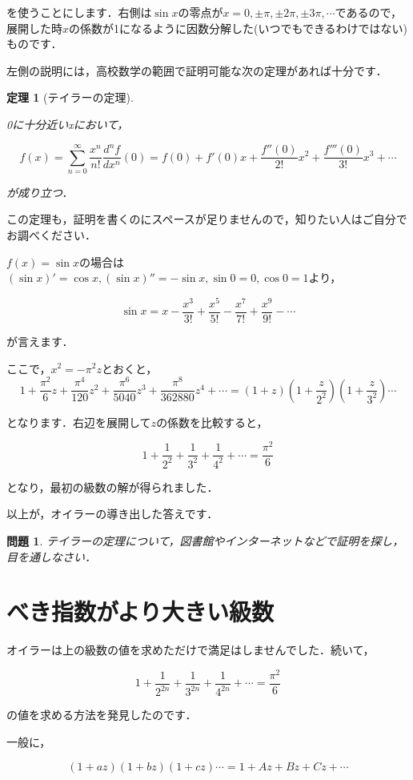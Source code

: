 \documentclass[./main]{subfiles}
\theoremstyle{break}
\newtheorem*{thm}{定理}
\newtheorem*{prb}{問題}
\begin{document}
を使うことにします．右側は$\sin x$の零点が$x=0,\pm \pi,\pm 2\pi,\pm 3\pi,\cdots$であるので，展開した時$x$の係数が1になるように因数分解した(いつでもできるわけではない)ものです．

左側の説明には，高校数学の範囲で証明可能な次の定理があれば十分です．

\begin{thm}[テイラーの定理]
　

0に十分近いxにおいて，

\[f(x)=\sum_{n=0}^\infty \frac{x^n}{n!}\frac{d^nf}{dx^n}(0)=f(0)+f'(0)x+\frac{f''(0)}{2!}x^2+\frac{f'''(0)}{3!}x^3+\cdots\]

が成り立つ．
\end{thm}
この定理も，証明を書くのにスペースが足りませんので，知りたい人はご自分でお調べください．

$f(x)=\sin x$の場合は$(\sin x)'=\cos x,(\sin x)''=-\sin x,\sin 0=0,\cos 0=1$より，

\[\sin x=x-\frac{x^3}{3!}+\frac{x^5}{5!}-\frac{x^7}{7!}+\frac{x^9}{9!}-\cdots\]

が言えます．

ここで，$x^2=-\pi^2 z$とおくと，
\[1+\frac{\pi^2}{6}z+\frac{\pi^4}{120}z^2+\frac{\pi^6}{5040}z^3+\frac{\pi^8}{362880}z^4+\cdots=\left(  1+z\right)\left(  1+\frac{z}{2^2}\right)\left(  1+\frac{z}{3^2}\right)\cdots\]

となります．右辺を展開して$z$の係数を比較すると，

\[1+\frac{1}{2^2}+\frac{1}{3^2}+\frac{1}{4^2}+\cdots=\frac{\pi^2}{6}\]

となり，最初の級数の解が得られました．

以上が，オイラーの導き出した答えです．

\begin{prb}
テイラーの定理について，図書館やインターネットなどで証明を探し，目を通しなさい．
\end{prb}

\section{べき指数がより大きい級数}
オイラーは上の級数の値を求めただけで満足はしませんでした．続いて，

\[1+\frac{1}{2^{2n}}+\frac{1}{3^{2n}}+\frac{1}{4^{2n}}+\cdots=\frac{\pi^2}{6}\]

の値を求める方法を発見したのです．

一般に，

\[(1+az)(1+bz)(1+cz)\cdots=1+Az+Bz+Cz+\cdots\]
\end{document}
